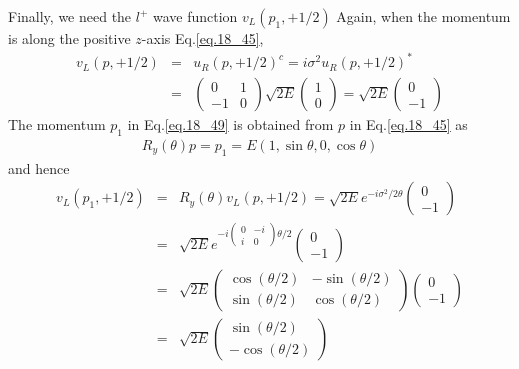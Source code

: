 \documentclass[12pt]{article}
\def\th{\theta}
\begin{document}
Finally, we need the $l^+$ wave function $v_L(p_1,+1/2)$
Again, when the momentum is along the positive $z$-axis Eq.\ref{eq.18_45},
\begin{eqnarray}
    v_L(p,+1/2) &=& u_R(p,+1/2)^c = i\sigma^2 u_R(p,+1/2)^* \\
    &=& 
    \begin{pmatrix}
        0 & 1 \\
        -1 & 0
    \end{pmatrix}
    \sqrt{2E}
    \begin{pmatrix}
        1 \\ 0
    \end{pmatrix}
    =\sqrt{2E}
    \begin{pmatrix}
        0 \\ -1
    \end{pmatrix} \label{eq.18_49}
\end{eqnarray}
The momentum $p_1$ in Eq.\ref{eq.18_49} is obtained from $p$ in Eq.\ref{eq.18_45} as
\begin{eqnarray}
    R_y(\theta) p = p_1 = E(1,  \sin\theta, 0,  \cos\theta) \label{eq.18_50}
\end{eqnarray}
and hence
\begin{eqnarray}
    v_L(p_1,+1/2) &=& R_y(\theta) v_L(p,+1/2) = \sqrt{2E} e^{-i\sigma^2/2 \theta}
    \begin{pmatrix}
        0 \\ -1
    \end{pmatrix}\\
    &=& \sqrt{2E}  e^{-i
    \begin{pmatrix}
        0 & -i \\
        i & 0
    \end{pmatrix}
    \theta/2}
    \begin{pmatrix}
        0 \\ -1
    \end{pmatrix}\\
    &=&\sqrt{2E}
    \begin{pmatrix}
        \cos(\th/2) & -\sin(\th/2)\\
        \sin(\th/2) &  \cos(\th/2)
    \end{pmatrix}
    \begin{pmatrix}
        0 \\ -1
    \end{pmatrix}\\
    &=& \sqrt{2E}
    \begin{pmatrix}
        \sin(\th/2) \\ -\cos(\th/2)
    \end{pmatrix}\label{eq.18_51}
\end{eqnarray}
\end{document}
